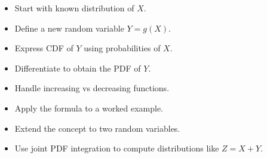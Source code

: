 \documentclass{article}
\begin{document}
\begin{itemize}
\item Start with known distribution of $X$.
\item Define a new random variable $Y = g(X)$.
\item Express CDF of $Y$ using probabilities of $X$.
\item Differentiate to obtain the PDF of $Y$.
\item Handle increasing vs decreasing functions.
\item Apply the formula to a worked example.
\item Extend the concept to two random variables.
\item Use joint PDF integration to compute distributions like $Z = X + Y$.
\end{itemize}
\end{document}
